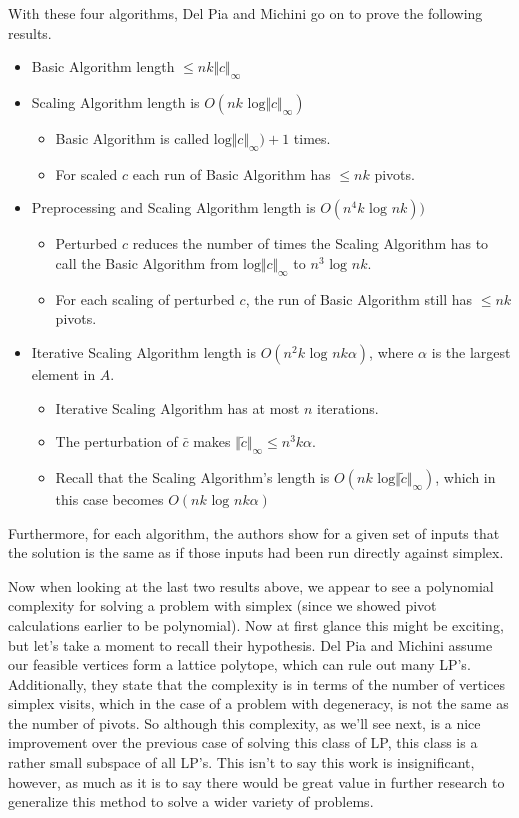 \documentclass[11pt]{article}
\begin{document}
With these four algorithms, Del Pia and Michini go on to prove the following results.
\begin{itemize}
	\item Basic Algorithm length $\leq nk \Vert c \Vert_\infty$
	\item Scaling Algorithm length is $O(nk \text{ log}\Vert c \Vert_\infty)$
	\begin{itemize}
		\item Basic Algorithm is called $\text{log}\Vert c \Vert_\infty) + 1$ times.
		\item For scaled $c$ each run of Basic Algorithm has $\leq nk$ pivots.
	\end{itemize}
	\item Preprocessing and Scaling Algorithm length is $O(n^4k \text{ log } nk))$
	\begin{itemize}
		\item Perturbed $c$ reduces the number of times the Scaling Algorithm has to call the Basic Algorithm from $\text{log} \Vert c \Vert_\infty$ to $n^3 \text{ log } nk$.
		\item For each scaling of perturbed $c$, the run of Basic Algorithm still has $\leq nk$ pivots.
	\end{itemize}
	\item Iterative Scaling Algorithm length is $O(n^2 k \text{ log } nk\alpha)$, where $\alpha$ is the largest element in $A$.
	\begin{itemize}
		\item Iterative Scaling Algorithm has at most $n$ iterations.
		\item The perturbation of $\bar{c}$ makes $\Vert \tilde{c} \Vert_\infty \leq n^3 k \alpha$.
		\item Recall that the Scaling Algorithm's length is $O(nk \text{ log}\Vert \tilde{c} \Vert_\infty)$, which in this case becomes $O(nk \text{ log } n k \alpha)$
	\end{itemize}
\end{itemize}
Furthermore, for each algorithm, the authors show for a given set of inputs that the solution is the same as if those inputs had been run directly against simplex.

Now when looking at the last two results above, we appear to see a polynomial complexity for solving a problem with simplex (since we showed pivot calculations earlier to be polynomial). Now at first glance this might be exciting, but let's take a moment to recall their hypothesis. Del Pia and Michini assume our feasible vertices form a lattice polytope, which can rule out many LP's. Additionally, they state that the complexity is in terms of the number of vertices simplex visits, which in the case of a problem with degeneracy, is not the same as the number of pivots. So although this complexity, as we'll see next, is a nice improvement over the previous case of solving this class of LP, this class is a rather small subspace of all LP's. This isn't to say this work is insignificant, however, as much as it is to say there would be great value in further research to generalize this method to solve a wider variety of problems.
\end{document}
